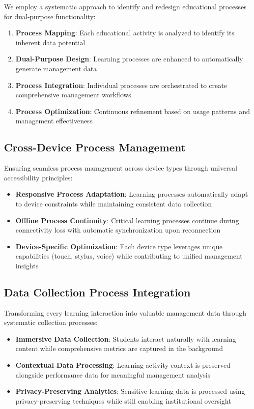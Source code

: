 \documentclass[conference]{IEEEtran}
\begin{document}
We employ a systematic approach to identify and redesign educational processes for dual-purpose functionality:

\begin{enumerate}
    \item \textbf{Process Mapping}: Each educational activity is analyzed to identify its inherent data potential
    \item \textbf{Dual-Purpose Design}: Learning processes are enhanced to automatically generate management data
    \item \textbf{Process Integration}: Individual processes are orchestrated to create comprehensive management workflows
    \item \textbf{Process Optimization}: Continuous refinement based on usage patterns and management effectiveness
\end{enumerate}

\subsection{Cross-Device Process Management}

Ensuring seamless process management across device types through universal accessibility principles:

\begin{itemize}
    \item \textbf{Responsive Process Adaptation}: Learning processes automatically adapt to device constraints while maintaining consistent data collection
    \item \textbf{Offline Process Continuity}: Critical learning processes continue during connectivity loss with automatic synchronization upon reconnection
    \item \textbf{Device-Specific Optimization}: Each device type leverages unique capabilities (touch, stylus, voice) while contributing to unified management insights
\end{itemize}

\subsection{Data Collection Process Integration}

Transforming every learning interaction into valuable management data through systematic collection processes:

\begin{itemize}
    \item \textbf{Immersive Data Collection}: Students interact naturally with learning content while comprehensive metrics are captured in the background
    \item \textbf{Contextual Data Processing}: Learning activity context is preserved alongside performance data for meaningful management analysis
    \item \textbf{Privacy-Preserving Analytics}: Sensitive learning data is processed using privacy-preserving techniques while still enabling institutional oversight
\end{itemize}
\end{document}
